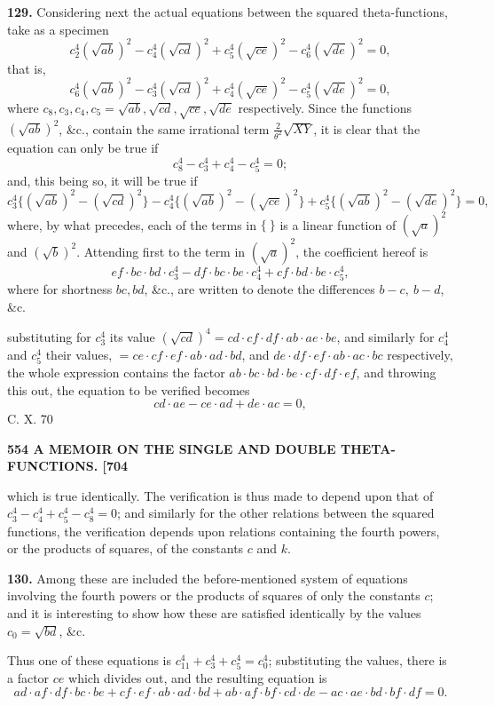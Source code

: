 \documentclass[11pt]{article}
\begin{document}
\medskip
\textbf{129.} Considering next the actual equations between the squared theta-functions, take as a specimen
\[
c_2^4(\sqrt{ab})^2 - c_4^4(\sqrt{cd})^2 + c_5^4(\sqrt{ce})^2 - c_6^4(\sqrt{de})^2 = 0,
\]
that is,
\[
c_6^4(\sqrt{ab})^2 - c_3^4(\sqrt{cd})^2 + c_4^4(\sqrt{ce})^2 - c_5^4(\sqrt{de})^2 = 0,
\]
where $c_8, c_3, c_4, c_5 = \sqrt{ab}, \sqrt{cd}, \sqrt{ce}, \sqrt{de}$ respectively. Since the functions $(\sqrt{ab})^2$, \&c., contain the same irrational term $\tfrac{2}{\theta^2}\sqrt{XY}$, it is clear that the equation can only be true if
\[
c_8^4 - c_3^4 + c_4^4 - c_5^4 = 0;
\]
and, this being so, it will be true if
\[
c_3^4\bigl\{(\sqrt{ab})^2 - (\sqrt{cd})^2\bigr\} - c_4^4\bigl\{(\sqrt{ab})^2 - (\sqrt{ce})^2\bigr\} + c_5^4\bigl\{(\sqrt{ab})^2 - (\sqrt{de})^2\bigr\} = 0,
\]
where, by what precedes, each of the terms in $\{\ \}$ is a linear function of $(\sqrt{a})^2$ and $(\sqrt{b})^2$. Attending first to the term in $(\sqrt{a})^2$, the coefficient hereof is
\[
ef\cdot bc\cdot bd\cdot c_3^4 - df\cdot bc\cdot be\cdot c_4^4 + cf\cdot bd\cdot be\cdot c_5^4,
\]
where for shortness $bc, bd$, \&c., are written to denote the differences $b-c,\ b-d$, \&c.

\medskip
substituting for $c_3^4$ its value $(\sqrt{cd})^4 = cd\cdot cf\cdot df\cdot ab\cdot ae\cdot be$, and similarly for $c_4^4$ and $c_5^4$ their values, $=ce\cdot cf\cdot ef\cdot ab\cdot ad\cdot bd$, and $de\cdot df\cdot ef\cdot ab\cdot ac\cdot bc$ respectively, the whole expression contains the factor $ab\cdot bc\cdot bd\cdot be\cdot cf\cdot df\cdot ef$, and throwing this out, the equation to be verified becomes
\[
cd\cdot ae - ce\cdot ad + de\cdot ac = 0,
\]
\hfill C. X. \hfill 70

\newpage
\noindent\textbf{554 \hfill A MEMOIR ON THE SINGLE AND DOUBLE THETA-FUNCTIONS. \hfill [704}

\medskip
which is true identically. The verification is thus made to depend upon that of $c_3^4 - c_4^4 + c_5^4 - c_8^4 = 0$; and similarly for the other relations between the squared functions, the verification depends upon relations containing the fourth powers, or the products of squares, of the constants $c$ and $k$.

\medskip
\textbf{130.} Among these are included the before-mentioned system of equations involving the fourth powers or the products of squares of only the constants $c$; and it is interesting to show how these are satisfied identically by the values $c_0 = \sqrt{bd}$, \&c.

\medskip
Thus one of these equations is $c_{11}^4 + c_3^4 + c_5^4 = c_0^4$; substituting the values, there is a factor $ce$ which divides out, and the resulting equation is
\[
ad\cdot af\cdot df\cdot bc\cdot be + cf\cdot ef\cdot ab\cdot ad\cdot bd + ab\cdot af\cdot bf\cdot cd\cdot de - ac\cdot ae\cdot bd\cdot bf\cdot df = 0.
\]
\end{document}
